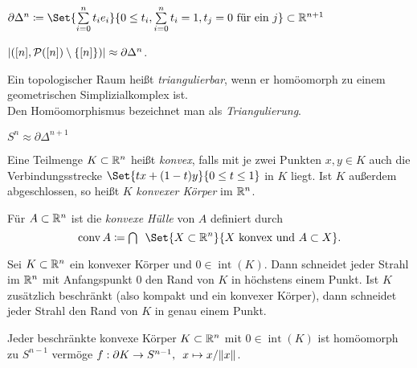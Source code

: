 \documentclass{cheat-sheet}
\DeclareMathOperator{\inte}{int} %
\DeclareMathOperator{\conv}{conv} %
\newcommand{\Pow}{\mathcal{P}} %
\begin{document}

\begin{defn}
  $\partial \Delta^n \coloneqq \Set{ \sum_{i=0}^n t_i e_i }{ 0 \leq t_i, \sum_{i=0}^n t_i = 1, t_j = 0 \text{ für ein } j } \subset \R^{n+1}$
\end{defn}

\begin{prop}
  $\abs{([n], \Pow([n]) \setminus \{ [n] \})} \approx \partial \Delta^n$.
\end{prop}

\begin{defn}
  Ein topologischer Raum heißt \emph{triangulierbar}, wenn er homöomorph zu einem geometrischen Simplizialkomplex ist.\\
  Den Homöomorphismus bezeichnet man als \emph{Triangulierung}.
\end{defn}

\begin{bsp}
  $S^n \approx \partial \Delta^{n+1}$
\end{bsp}

\begin{defn}
  Eine Teilmenge $K \subset \mathbb{R}^n$ heißt \emph{konvex}, falls mit je zwei Punkten $x, y \in K$ auch die Verbindungsstrecke $\Set{tx + (1-t)y}{ 0 \leq t \leq 1 }$ in $K$ liegt. Ist $K$ außerdem abgeschlossen, so heißt $K$ \emph{konvexer Körper} im $\mathbb{R}^n$.
\end{defn}

\begin{defn}
  Für $A \subset \mathbb{R}^n$ ist die \emph{konvexe Hülle} von $A$ definiert durch
  \[ \conv A \coloneqq \bigcap \enspace \Set{X \subset \R^n}{X \text{ konvex und } A \subset X}. \]
\end{defn}

\begin{prop}
  Sei $K \subset \mathbb{R}^n$ ein konvexer Körper und $0 \in \inte(K)$. Dann schneidet jeder Strahl im $\mathbb{R}^n$ mit Anfangspunkt $0$ den Rand von $K$ in höchstens einem Punkt. Ist $K$ zusätzlich beschränkt (also kompakt und ein konvexer Körper), dann schneidet jeder Strahl den Rand von $K$ in genau einem Punkt.
\end{prop}

\begin{prop}
  Jeder beschränkte konvexe Körper $K \subset \mathbb{R}^n$ mit $0 \in \inte(K)$ ist homöomorph zu $S^{n-1}$ vermöge
  $f : \partial K \to S^{n-1}, \enspace x \mapsto x / \lVert x\rVert$.
\end{prop}
\end{document}
